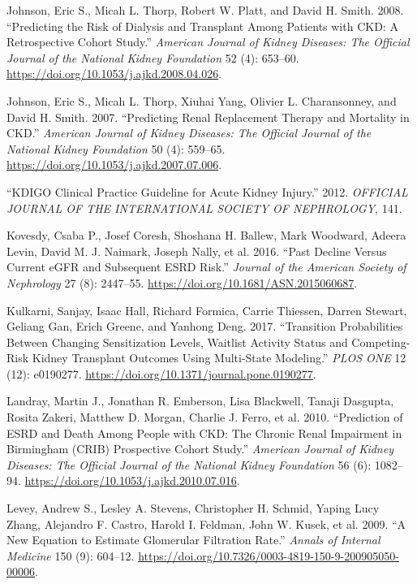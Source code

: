 \documentclass[
]{article}
\newlength{\cslhangindent}
\newenvironment{cslreferences}%
  {\setlength{\parindent}{0pt}%
  \everypar{\setlength{\hangindent}{\cslhangindent}}\ignorespaces}%
  {\par}
\begin{document}
\begin{cslreferences}
\leavevmode\hypertarget{ref-johnson_predicting_2008}{}%
Johnson, Eric S., Micah L. Thorp, Robert W. Platt, and David H. Smith. 2008. ``Predicting the Risk of Dialysis and Transplant Among Patients with CKD: A Retrospective Cohort Study.'' \emph{American Journal of Kidney Diseases: The Official Journal of the National Kidney Foundation} 52 (4): 653--60. \url{https://doi.org/10.1053/j.ajkd.2008.04.026}.

\leavevmode\hypertarget{ref-johnson_predicting_2007}{}%
Johnson, Eric S., Micah L. Thorp, Xiuhai Yang, Olivier L. Charansonney, and David H. Smith. 2007. ``Predicting Renal Replacement Therapy and Mortality in CKD.'' \emph{American Journal of Kidney Diseases: The Official Journal of the National Kidney Foundation} 50 (4): 559--65. \url{https://doi.org/10.1053/j.ajkd.2007.07.006}.

\leavevmode\hypertarget{ref-noauthor_kdigo_2012}{}%
``KDIGO Clinical Practice Guideline for Acute Kidney Injury.'' 2012. \emph{OFFICIAL JOURNAL OF THE INTERNATIONAL SOCIETY OF NEPHROLOGY}, 141.

\leavevmode\hypertarget{ref-kovesdy_past_2016}{}%
Kovesdy, Csaba P., Josef Coresh, Shoshana H. Ballew, Mark Woodward, Adeera Levin, David M. J. Naimark, Joseph Nally, et al. 2016. ``Past Decline Versus Current eGFR and Subsequent ESRD Risk.'' \emph{Journal of the American Society of Nephrology} 27 (8): 2447--55. \url{https://doi.org/10.1681/ASN.2015060687}.

\leavevmode\hypertarget{ref-kulkarni_transition_2017}{}%
Kulkarni, Sanjay, Isaac Hall, Richard Formica, Carrie Thiessen, Darren Stewart, Geliang Gan, Erich Greene, and Yanhong Deng. 2017. ``Transition Probabilities Between Changing Sensitization Levels, Waitlist Activity Status and Competing-Risk Kidney Transplant Outcomes Using Multi-State Modeling.'' \emph{PLOS ONE} 12 (12): e0190277. \url{https://doi.org/10.1371/journal.pone.0190277}.

\leavevmode\hypertarget{ref-landray_prediction_2010}{}%
Landray, Martin J., Jonathan R. Emberson, Lisa Blackwell, Tanaji Dasgupta, Rosita Zakeri, Matthew D. Morgan, Charlie J. Ferro, et al. 2010. ``Prediction of ESRD and Death Among People with CKD: The Chronic Renal Impairment in Birmingham (CRIB) Prospective Cohort Study.'' \emph{American Journal of Kidney Diseases: The Official Journal of the National Kidney Foundation} 56 (6): 1082--94. \url{https://doi.org/10.1053/j.ajkd.2010.07.016}.

\leavevmode\hypertarget{ref-levey_new_2009}{}%
Levey, Andrew S., Lesley A. Stevens, Christopher H. Schmid, Yaping Lucy Zhang, Alejandro F. Castro, Harold I. Feldman, John W. Kusek, et al. 2009. ``A New Equation to Estimate Glomerular Filtration Rate.'' \emph{Annals of Internal Medicine} 150 (9): 604--12. \url{https://doi.org/10.7326/0003-4819-150-9-200905050-00006}.


\end{cslreferences}
\end{document}
